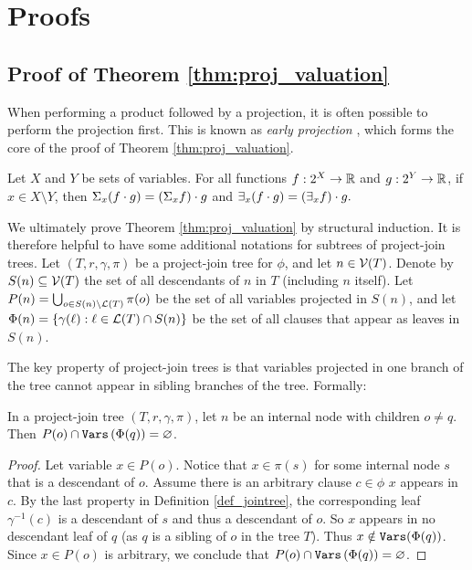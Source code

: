 



\section{Proofs}
\label{appendix:proofs}

\subsection{Proof of Theorem \ref{thm:proj_valuation}}
When performing a product followed by a projection, it is often possible to perform the projection first.
This is known as \emph{early projection} \cite{MPPV04}, which forms the core of the proof of Theorem \ref{thm:proj_valuation}.
\begin{theorem}
\label{thm:early_projection}
    Let $X$ and $Y$ be sets of variables.
    For all functions $f: 2^X \to \mathbb{R}$ and $g: 2^Y \to \mathbb{R}$, if $x \in X \setminus Y$, then $\Sigma_x (f \cdot g) = \left( \Sigma_x f \right) \cdot g$ and $\exists_x (f \cdot g) = \left( \exists_x f \right) \cdot g.$
\end{theorem}

We ultimately prove Theorem \ref{thm:proj_valuation} by structural induction. 
It is therefore helpful to have some additional notations for subtrees of project-join trees.
Let $(T, r, \gamma, \pi)$ be a project-join tree for $\phi$, and let $n \in \mathcal{V}(T)$. Denote by $S(n) \subseteq \mathcal{V}(T)$ the set of all descendants of $n$ in $T$ (including $n$ itself). 
Let $P(n) = \bigcup_{o \in S(n) \setminus \mathcal{L}(T)} \pi(o)$ be the set of all variables projected in $S(n)$, and let $\Phi(n) = \{ \gamma(\ell) : \ell \in \mathcal{L}(T) \cap S(n) \}$ be the set of all clauses that appear as leaves in $S(n)$.

The key property of project-join trees is that variables projected in one branch of the tree cannot appear in sibling branches of the tree. Formally:
\begin{lemma}
\label{lemma:disjoint_P}
    In a project-join tree $(T, r, \gamma, \pi)$, let $n$ be an internal node with children $o \ne q$.
    Then $P(o) \cap \texttt{\upshape Vars} \left( \Phi(q) \right) = \varnothing$.
\end{lemma}
\begin{proof}
    Let variable $x \in P(o)$.
    Notice that $x \in \pi(s)$ for some internal node $s$ that is a descendant of $o$.
    Assume there is an arbitrary clause $c \in \phi$ \st{} $x$ appears in $c$.
    By the last property in Definition \ref{def_jointree}, the corresponding leaf $\gamma^{-1}(c)$ is a descendant of $s$ and thus a descendant of $o$.
    So $x$ appears in no descendant leaf of $q$ (as $q$ is a sibling of $o$ in the tree $T$).
    Thus $x \notin \texttt{\upshape Vars}(\Phi(q))$. Since $x \in P(o)$ is arbitrary, we conclude that $P(o) \cap \texttt{\upshape Vars} \left( \Phi(q) \right) = \varnothing$.
\end{proof}

